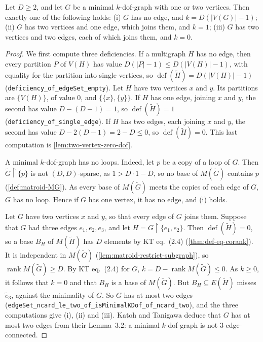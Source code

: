 \begin{lemma}
  \label{lem:two-vertex-trichotomy}
  \leanok
  Let $D \ge 2$, and let $G$ be a minimal $k$-dof-graph with one or two
  vertices. Then exactly one of the following holds: (i) $G$ has no
  edge, and $k = D(|V(G)| - 1)$; (ii) $G$ has two vertices and one edge,
  which joins them, and $k = 1$; (iii) $G$ has two vertices and two
  edges, each of which joins them, and $k = 0$.
\end{lemma}
\begin{proof}
  \leanok
  We first compute three deficiencies. If a multigraph $H$ has no edge,
  then every partition $P$ of $V(H)$ has value
  $D(|P| - 1) \le D(|V(H)| - 1)$, with equality for the partition into
  single vertices, so $\operatorname{def}(\tilde H) = D(|V(H)| - 1)$
  (\texttt{deficiency\_\allowbreak{}of\_\allowbreak{}edgeSet\_\allowbreak{}empty}).
  Let $H$ have two vertices $x$ and $y$. Its partitions are $\{V(H)\}$,
  of value $0$, and $\{\{x\}, \{y\}\}$. If $H$ has one edge, joining $x$
  and $y$, the second has value $D - (D - 1) = 1$, so
  $\operatorname{def}(\tilde H) = 1$
  (\texttt{deficiency\_\allowbreak{}of\_\allowbreak{}single\_\allowbreak{}edge}).
  If $H$ has two edges, each joining
  $x$ and $y$, the second has value $D - 2(D - 1) = 2 - D \le 0$, so
  $\operatorname{def}(\tilde H) = 0$. This last computation is
  \cref{lem:two-vertex-zero-dof}.

  A minimal $k$-dof-graph has no loops. Indeed, let $p$ be a copy of a
  loop of $G$. Then $\tilde G \restriction \{p\}$ is not
  $(D, D)$-sparse, as $1 > D \cdot 1 - D$, so no base of $M(\tilde G)$
  contains $p$ (\cref{def:matroid-MG}). As every base of $M(\tilde G)$
  meets the copies of each edge of $G$, $G$ has no loop. Hence if $G$ has
  one vertex, it has no edge, and (i) holds.

  Let $G$ have two vertices $x$ and $y$, so that every edge of $G$ joins
  them. Suppose that $G$ had three edges $e_1, e_2, e_3$, and let
  $H = G \restriction \{e_1, e_2\}$. Then
  $\operatorname{def}(\tilde H) = 0$, so a base $B_H$ of $M(\tilde H)$
  has $D$ elements by KT eq.~(2.4) (\cref{thm:def-eq-corank}). It is
  independent in $M(\tilde G)$ (\cref{lem:matroid-restrict-subgraph}),
  so $\operatorname{rank} M(\tilde G) \ge D$. By KT eq.~(2.4) for $G$,
  $k = D - \operatorname{rank} M(\tilde G) \le 0$. As $k \ge 0$, it
  follows that $k = 0$ and that $B_H$ is a base of $M(\tilde G)$. But
  $B_H \subseteq E(\tilde H)$ misses $\tilde e_3$, against the
  minimality of $G$. So $G$ has at most two edges
  (\texttt{edgeSet\_\allowbreak{}ncard\_\allowbreak{}le\_\allowbreak{}two\_\allowbreak{}of\_\allowbreak{}isMinimalKDof\_\allowbreak{}of\_\allowbreak{}ncard\_\allowbreak{}two}),
  and the three computations give (i), (ii) and (iii). Katoh and
  Tanigawa deduce that $G$ has at most two edges from their Lemma~3.2: a
  minimal $k$-dof-graph is not $3$-edge-connected.
\end{proof}
